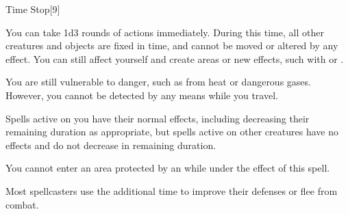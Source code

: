 \begin{spellsection}{Time Stop}[9]
    \begin{spellheader}
    \end{spellheader}
    \begin{spellcontent}
        \begin{spelleffects}
            \spelleffect You can take 1d3 rounds of actions immediately. During this time, all other creatures and objects are fixed in time, and cannot be moved or altered by any effect. You can still affect yourself and create areas or new effects, such with  or .

            You are still vulnerable to danger, such as from heat or dangerous gases. However, you cannot be detected by any means while you travel.
        \end{spelleffects}
    \end{spellcontent}
    \begin{spellfooter}
        \spellnotes Spells active on you have their normal effects, including decreasing their remaining duration as appropriate, but spells active on other creatures have no effects and do not decrease in remaining duration.

        You cannot enter an area protected by an  while under the effect of this spell.

        Most spellcasters use the additional time to improve their defenses or flee from combat.
        \miscastexplode
    \end{spellfooter}
\end{spellsection}

